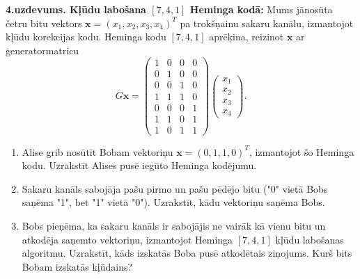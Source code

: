 \documentclass[a4paper,12pt]{article}
\begin{document}
\vspace{6pt}
{\bf 4.uzdevums. Kļūdu labošana $[7,4,1]$ Heminga kodā:} 
Mums jānosūta četru bitu vektors $\mathbf{x}=(x_1,x_2,x_3,x_4)^T$ 
pa trokšņainu sakaru kanālu, izmantojot kļūdu korekcijas kodu. 
Heminga kodu  $[7,4,1]$ aprēķina, reizinot $\mathbf{x}$ ar 
ģeneratormatricu
$$G\mathbf{x} = \left(
\begin{array}{cccc}
1 & 0 & 0 & 0 \\
0 & 1 & 0 & 0 \\
0 & 0 & 1 & 0 \\
1 & 1 & 1 & 0 \\
0 & 0 & 0 & 1 \\
1 & 1 & 0 & 1 \\
1 & 0 & 1 & 1 
\end{array} \right) \left( \begin{array}{c}
x_1\\
x_2\\
x_3\\
x_4
\end{array} \right).$$
\begin{enumerate}
\item Alise grib nosūtīt Bobam vektoriņu $\mathbf{x} = (0,1,1,0)^T$, izmantojot šo Heminga kodu.
Uzrakstīt Alises pusē iegūto Heminga kodējumu.
\item Sakaru kanāls sabojāja pašu pirmo un pašu pēdējo bitu ("0" vietā Bobs saņēma "1",
bet "1" vietā "0"). Uzrakstīt, kādu vektoriņu saņēma Bobs.
\item Bobs pieņēma, ka sakaru kanāls ir sabojājis ne vairāk kā vienu bitu un atkodēja
saņemto vektoriņu, izmantojot Heminga $[7,4,1]$ kļūdu labošanas algoritmu. 
Uzrakstīt, kāds izskatās Boba pusē atkodētais ziņojums.
Kurš bits Bobam izskatās kļūdains?
\end{enumerate}
\end{document}

